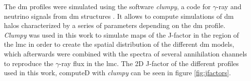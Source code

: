 \documentclass[main.tex]{subfiles}
\begin{document}
\begin{table}
  \centering
    \caption{Parameters of the \gls{dm} profiles used in this work. Values of NFW-mean and Iso-mean profiles are the same as of \cite{2015FermiLMCDM}. The $J$-factors are integrated over 10º from the halo center.} \label{tab:dmprofiles}
\end{table}

The \gls{dm} profiles were simulated using the software \textit{clumpy}, a code for $\gamma$-ray and neutrino signals from \gls{dm} structures \cite{2019CLUMPY}. It allows to compute simulations of \gls{dm} halos characterized by a series of parameters depending on the \gls{dm} profile. \textit{Clumpy} was used in this work to simulate maps of the J-factor in the region of the \gls{lmc} in order to create the spatial distribution of the different \gls{dm} models, which afterwards were combined with the spectra of several annihilation channels to reproduce the $\gamma$-ray flux in the \gls{lmc}. 
The 2D J-factor of the different profiles used in this work, computeD with \textit{clumpy} can be seen in figure \ref{fig:jfactors}.
\end{document}
